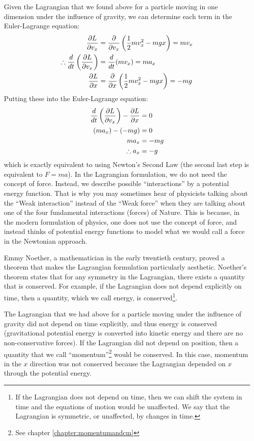 Given the Lagrangian that we found above for a particle moving in one dimension under the influence of gravity, we can determine each term in the Euler-Lagrange equation:
\begin{align*}
\frac{\partial L}{\partial v_x} &= \frac{\partial }{\partial v_x}\left(\frac{1}{2}mv_x^2 - mgx \right)=mv_x\\
\therefore\frac{d}{dt}\left(\frac{\partial L}{\partial v_x}\right) &= \frac{d}{dt} (mv_x) = ma_x\\
\frac{\partial L}{\partial x}&= \frac{\partial }{\partial x}\left(\frac{1}{2}mv_x^2 - mgx\right) = -mg\\
\end{align*}
Putting these into the Euler-Lagrange equation:
\begin{align*}
\frac{d}{dt}\left(\frac{\partial L}{\partial v_x}\right)-\frac{\partial L}{\partial x} &= 0\\
(ma_x) - (-mg) &=0\\
ma_x&=-mg\\
\therefore a_x &= -g
\end{align*}
which is exactly equivalent to using Newton's Second Law (the second last step is equivalent to $F=ma$). In the Lagrangian formulation, we do not need the concept of force. Instead, we describe possible ``interactions'' by a potential energy function. That is why you may sometimes hear of physicists talking about the ``Weak interaction'' instead of the ``Weak force'' when they are talking about one of the four fundamental interactions (forces) of Nature. This is because, in the modern formulation of physics, one does not use the concept of force, and instead thinks of potential energy functions to model what we would call a force in the Newtonian approach.

Emmy Noether, a mathematician in the early twentieth century, proved a theorem that makes the Lagrangian formulation particularly aesthetic.
 Noether's theorem states that for any symmetry in the Lagrangian, there exists a quantity that is conserved. For example, if the Lagrangian does not depend explicitly on time, then a quantity, which we call energy, is conserved\footnote{If the Lagrangian does not depend on time, then we can shift the system in time and the equations of motion would be unaffected. We say that the Lagrangian is symmetric, or unaffected, by changes in time.}. 

The Lagrangian that we had above for a particle moving under the influence of gravity did not depend on time explicitly, and thus energy is conserved (gravitational potential energy is converted into kinetic energy and there are no non-conservative forces). If the Lagrangian did not depend on position, then a quantity that we call ``momentum''\footnote{See chapter \ref{chapter:momentumandcm}} would be conserved. In this case, momentum in the $x$ direction was not conserved because the Lagrangian depended on $x$ through the potential energy. 

